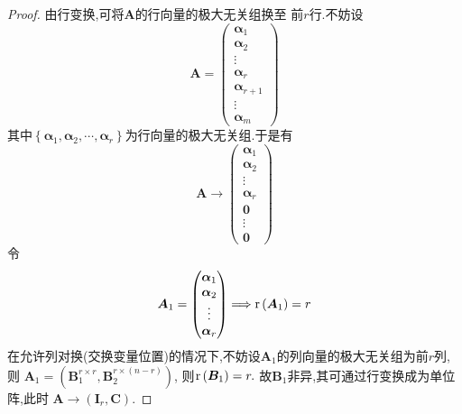 {\begin{proof}
    由行变换,可将$\bm{A}$的行向量的极大无关组换至
    前$r$行.不妨设
    \[
        \bm{A}=\begin{pmatrix}
            \bm{\alpha}_1     \\
            \bm{\alpha}_2     \\
            \vdots            \\
            \bm{\alpha}_r     \\
            \bm{\alpha}_{r+1} \\
            \vdots            \\
            \bm{\alpha}_m
        \end{pmatrix}
    \]
    其中$\left\{\bm{\alpha}_1,
        \bm{\alpha}_2,
        \cdots,\bm{\alpha}_r\right\}$为行向量的极大无关组.于是有
    \[
        \bm{A}\longrightarrow
        \begin{pmatrix}
            \bm{\alpha}_1 \\
            \bm{\alpha}_2 \\
            \vdots        \\
            \bm{\alpha}_r \\
            \bm{0}        \\
            \vdots        \\
            \bm{0}
        \end{pmatrix}
    \]
    令\[
        \bm{A}_1=\begin{pmatrix}
            \bm{\alpha}_1 \\\bm{\alpha}_2\\\vdots\\\bm{\alpha}_r
        \end{pmatrix}\Longrightarrow
        \mathrm{r} \left(\bm{A}_1\right)=r
    \]
    在允许列对换(交换变量位置)的情况下,不妨设$\bm{A}_1$的列向量的极大无关组为前$r$列,则
    $\bm{A}_1=\left(\bm{B}_1^{r\times r}
        ,\bm{B}_2^{r\times \left(n-r\right)}\right)$,
    则$\mathrm{r} \left(\bm{B}_1\right)=r.$
    故$\bm{B}_1$非异,其可通过行变换成为单位阵,此时
    $\bm{A}\longrightarrow \left(\bm{I}_r,
        \bm{C}\right)$.


\end{proof}}
